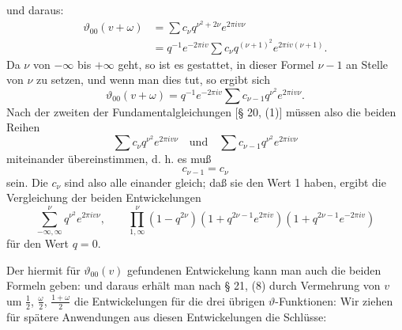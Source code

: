 und daraus:
\[
\begin{aligned}
\vartheta_{00}(v+\omega) &= \sum c_\nu q^{\nu^2+2\nu} e^{2\pi i v \nu}\\
&=q^{-1}e^{-2\pi i v}\sum c_\nu q^{(\nu+1)^2}e^{2\pi i v(\nu+1)}.
\end{aligned}
\]
Da $\nu$ von $-\infty$ bis $+\infty$ geht, so ist es gestattet, in dieser Formel $\nu - 1$
an Stelle von $\nu$ zu setzen, und wenn man dies tut, so ergibt sich
\[
\vartheta_{00}(v+\omega) = q^{-1}e^{-2\pi i v}\sum c_{\nu-1} q^{\nu^2}e^{2\pi i v \nu}.
\]
Nach der zweiten der Fundamentalgleichungen [§ 20, (1)] m\"ussen also die beiden Reihen
\[
\sum c_\nu q^{\nu^2}e^{2\pi i v \nu} \quad \text{und} \quad \sum c_{\nu-1} q^{\nu^2}e^{2\pi i v \nu}
\]
miteinander \"ubereinstimmen, d. h. es mu\ss{}
\[
c_{\nu-1} = c_\nu
\]
sein. Die $c_\nu$ sind also alle einander gleich; da\ss{} sie den Wert 1 haben, ergibt die
Vergleichung der beiden Entwickelungen
\[
\sum_{-\infty,\infty}^{\nu} q^{\nu^2}e^{2\pi i v \nu}, \qquad \prod_{1,\infty}^{\nu}(1 - q^{2\nu})(1 + q^{2\nu-1}e^{2\pi i v})(1 + q^{2\nu-1}e^{-2\pi i v})
\]
f\"ur den Wert $q = 0$.

Der hiermit f\"ur $\vartheta_{00}(v)$ gefundenen Entwickelung kann man auch die beiden
Formeln geben:
und daraus erh\"alt man nach § 21, (8) durch Vermehrung von $v$ um $\frac{1}{2}$,
$\frac{\omega}{2}$, $\frac{1+\omega}{2}$ die Entwickelungen f\"ur die drei \"ubrigen
$\vartheta$-Funktionen:
Wir ziehen f\"ur sp\"atere Anwendungen aus diesen Entwickelungen die Schl\"usse:
